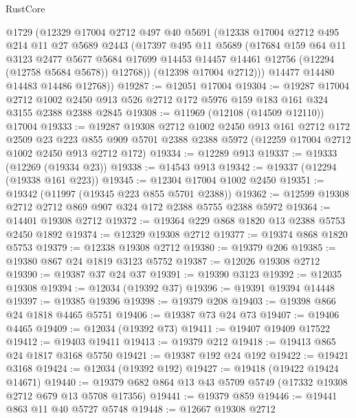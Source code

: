 \begin{lexlean}{RustCore}
\begin{coremodule}
        @1729
        (@12329
          @17004
          @2712
          @497
          @40
          @5691
          (@12338
            @17004
            @2712
            @495
            @214
            @11
            @27
            @5689
            @2443
            (@17397
              @495
              @11
              @5689
              (@17684
                @159
                @64
                @11
                @3123
                @2477
                @5677
                @5684
                @17699
                @14453
                @14457
                @14461
                @12756
                (@12294 (@12758 @5684 @5678))
                @12768))
            (@12398 @17004 @2712)))
        @14477
        @14480
        @14483
        @14486
        @12768))
@19287 := @12051 @17004
@19304 := @19287
    @17004
    @2712
    @1002
    @2450
    @913
    @526
    @2712
    @172
    @5976
    @159
    @183
    @161
    @324
    @3155
    @2388
    @2388
    @2845
@19308 := @11969 (@12108 (@14509 @12110)) @17004
@19333 := @19287
    @19308
    @2712
    @1002
    @2450
    @913
    @161
    @2712
    @172
    @2509
    @23
    @223
    @855
    @909
    @5701
    @2388
    @2388
    @5972
    (@12259 @17004 @2712 @1002 @2450 @913 @2712 @172)
@19334 := @12289 @913
@19337 := @19333 (@12269 (@19334 @23))
@19338 := @14543 @913
@19342 := @19337 (@12294 (@19338 @161 @223))
@19345 := @12304 @17004 @1002 @2450
@19351 := @19342 (@11997 (@19345 @223 @855 @5701 @2388))
@19362 := @12599 @19308 @2712 @2712 @869 @907 @324 @172 @2388 @5755 @2388 @5972
@19364 := @14401 @19308 @2712
@19372 := @19364 @229 @868 @1820 @13 @2388 @5753 @2450 @1892
@19374 := @12329 @19308 @2712
@19377 := @19374 @868 @1820 @5753
@19379 := @12338 @19308 @2712
@19380 := @19379 @206
@19385 := @19380 @867 @24 @1819 @3123 @5752
@19387 := @12026 @19308 @2712
@19390 := @19387 @37 @24 @37
@19391 := @19390 @3123
@19392 := @12035 @19308
@19394 := @12034 (@19392 @37)
@19396 := @19391 @19394 @14448
@19397 := @19385 @19396
@19398 := @19379 @208
@19403 := @19398 @866 @24 @1818 @4465 @5751
@19406 := @19387 @73 @24 @73
@19407 := @19406 @4465
@19409 := @12034 (@19392 @73)
@19411 := @19407 @19409 @17522
@19412 := @19403 @19411
@19413 := @19379 @212
@19418 := @19413 @865 @24 @1817 @3168 @5750
@19421 := @19387 @192 @24 @192
@19422 := @19421 @3168
@19424 := @12034 (@19392 @192)
@19427 := @19418 (@19422 @19424 @14671)
@19440 := @19379 @682 @864 @13 @43 @5709 @5749 (@17332 @19308 @2712 @679 @13 @5708 @17356)
@19441 := @19379 @859
@19446 := @19441 @863 @11 @40 @5727 @5748
@19448 := @12667 @19308 @2712

\end{coremodule}
\end{lexlean}
